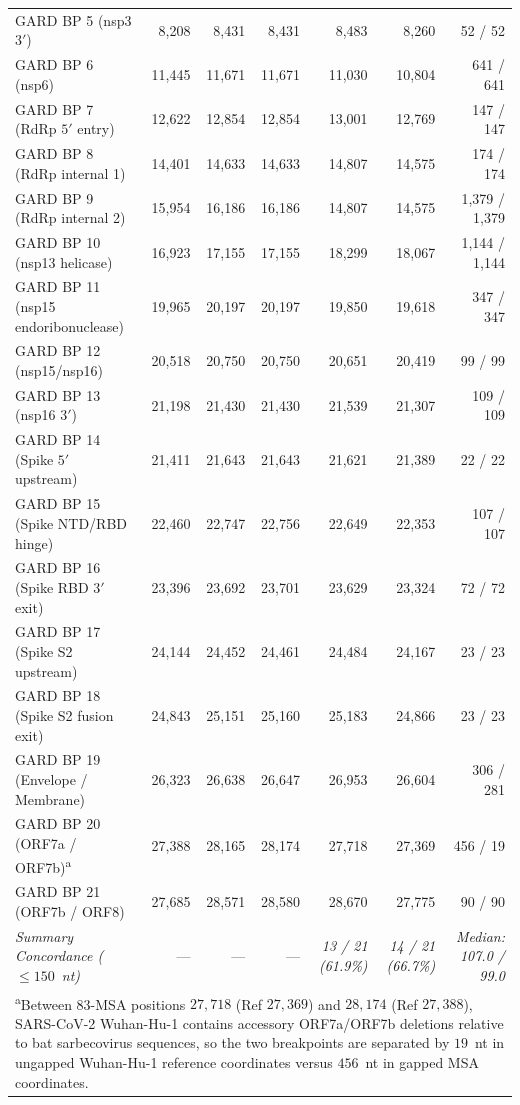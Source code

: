 \begin{table}[!ht]
{\begin{tabular}{@{}l rrr rrr@{}}
GARD BP 5 (nsp3 $3'$) & 8,208 & 8,431 & 8,431 & 8,483 & 8,260 & 52 / 52 \\
GARD BP 6 (nsp6) & 11,445 & 11,671 & 11,671 & 11,030 & 10,804 & 641 / 641 \\
GARD BP 7 (RdRp $5'$ entry) & 12,622 & 12,854 & 12,854 & 13,001 & 12,769 & 147 / 147 \\
GARD BP 8 (RdRp internal 1) & 14,401 & 14,633 & 14,633 & 14,807 & 14,575 & 174 / 174 \\
GARD BP 9 (RdRp internal 2) & 15,954 & 16,186 & 16,186 & 14,807 & 14,575 & 1,379 / 1,379 \\
GARD BP 10 (nsp13 helicase) & 16,923 & 17,155 & 17,155 & 18,299 & 18,067 & 1,144 / 1,144 \\
GARD BP 11 (nsp15 endoribonuclease) & 19,965 & 20,197 & 20,197 & 19,850 & 19,618 & 347 / 347 \\
GARD BP 12 (nsp15/nsp16) & 20,518 & 20,750 & 20,750 & 20,651 & 20,419 & 99 / 99 \\
GARD BP 13 (nsp16 $3'$) & 21,198 & 21,430 & 21,430 & 21,539 & 21,307 & 109 / 109 \\
GARD BP 14 (Spike $5'$ upstream) & 21,411 & 21,643 & 21,643 & 21,621 & 21,389 & 22 / 22 \\
GARD BP 15 (Spike NTD/RBD hinge) & 22,460 & 22,747 & 22,756 & 22,649 & 22,353 & 107 / 107 \\
GARD BP 16 (Spike RBD $3'$ exit) & 23,396 & 23,692 & 23,701 & 23,629 & 23,324 & 72 / 72 \\
GARD BP 17 (Spike S2 upstream) & 24,144 & 24,452 & 24,461 & 24,484 & 24,167 & 23 / 23 \\
GARD BP 18 (Spike S2 fusion exit) & 24,843 & 25,151 & 25,160 & 25,183 & 24,866 & 23 / 23 \\
GARD BP 19 (Envelope / Membrane) & 26,323 & 26,638 & 26,647 & 26,953 & 26,604 & 306 / 281 \\
GARD BP 20 (ORF7a / ORF7b)\textsuperscript{a} & 27,388 & 28,165 & 28,174 & 27,718 & 27,369 & 456 / 19 \\
GARD BP 21 (ORF7b / ORF8) & 27,685 & 28,571 & 28,580 & 28,670 & 27,775 & 90 / 90 \\
\midrule
\textit{Summary Concordance ($\le 150$~nt)} & --- & --- & --- & \textit{13 / 21 (61.9\%)} & \textit{14 / 21 (66.7\%)} & \textit{Median: 107.0 / 99.0} \\
\bottomrule
\multicolumn{7}{l}{\parbox{\textwidth}{\vspace{2pt}\tiny \textsuperscript{a}Between 83-MSA positions $27{,}718$ (Ref $27{,}369$) and $28{,}174$ (Ref $27{,}388$), SARS-CoV-2 Wuhan-Hu-1 contains accessory ORF7a/ORF7b deletions relative to bat sarbecovirus sequences, so the two breakpoints are separated by $19$~nt in ungapped Wuhan-Hu-1 reference coordinates versus $456$~nt in gapped MSA coordinates.}}
\end{tabular}}
\end{table}


